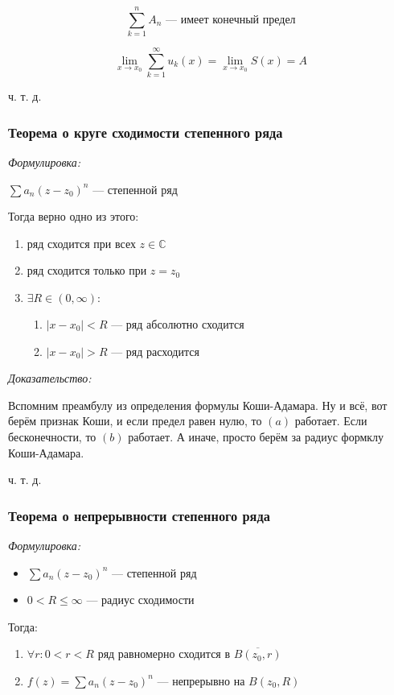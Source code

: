 \documentclass{article}
\begin{document}
\[\sum_{k = 1}^n A_n \text{ --- имеет конечный предел}\]

\[\lim_{x \rightarrow x_0} \sum_{k = 1}^{\infty} u_k(x) = \lim_{x \rightarrow x_0} S(x) = A\]

ч. т. д.

\subsubsection{Теорема о круге сходимости степенного ряда}
\textit{Формулировка:}

$\sum a_n (z - z_0)^n$ --- степенной ряд

Тогда верно одно из этого:

\begin{enumerate}
    \item ряд сходится при всех $z \in \mathbb{C}$
    \item ряд сходится только при $z = z_0$
    \item $\exists R \in (0, \infty):$ \begin{enumerate}
        \item $|x - x_0| < R$ --- ряд абсолютно сходится
        \item $|x - x_0| > R$ --- ряд расходится
    \end{enumerate}
\end{enumerate}

\textit{Доказательство:}

Вспомним преамбулу из определения формулы Коши-Адамара. Ну и всё, вот берём признак Коши, и если предел равен нулю, то $(a)$ работает. Если бесконечности, то $(b)$ работает. А иначе, просто берём за радиус формклу Коши-Адамара.

ч. т. д.


\subsubsection{Теорема о непрерывности степенного ряда}
\textit{Формулировка:}

\begin{itemize}
    \item $\sum a_n(z - z_0)^n$ --- степенной ряд
    \item $0 < R \le \infty$ --- радиус сходимости
\end{itemize}

Тогда:

\begin{enumerate}
    \item $\forall r:  0 < r < R$ ряд равномерно сходится в $\overline{B(z_0, r)}$
    \item $f(z) = \sum a_n (z - z_0)^n$ --- непрерывно на $B(z_0, R)$
\end{enumerate}
\end{document}
